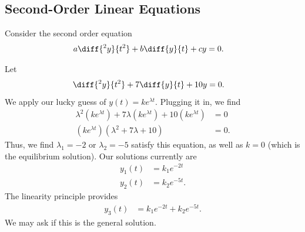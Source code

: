\documentclass[10pt]{mypackage}
\begin{document}
\subsection{Second-Order Linear Equations}%
Consider the second order equation
\begin{align*}
  a \diff{^2y}{t^2} + b\diff{y}{t} + cy &= 0.
\end{align*}
\begin{example}
  Let
  \begin{align*}
    \diff{^2y}{t^2} + 7\diff{y}{t} + 10y &= 0.
  \end{align*}
  We apply our lucky guess of $y(t) = ke^{\lambda t}$. Plugging it in, we find
  \begin{align*}
    \lambda^2\left(ke^{\lambda t}\right) + 7\lambda\left(ke^{\lambda t}\right) + 10\left(ke^{\lambda t}\right) &= 0\\
    \left(ke^{\lambda t}\right) \left(\lambda^2 + 7\lambda + 10\right) &= 0.
  \end{align*}
  Thus, we find $\lambda_1 = -2$ or $\lambda_2 = -5$ satisfy this equation, as well as $k = 0$ (which is the equilibrium solution). Our solutions currently are
  \begin{align*}
    y_1(t) &= k_1e^{-2t}\\
    y_2(t) &= k_2e^{-5t}.
  \end{align*}
  The linearity principle provides
  \begin{align*}
    y_3(t) &= k_1e^{-2t} + k_2e^{-5t}.
  \end{align*}
  We may ask if this is the general solution.\newline


\end{example}
\end{document}

